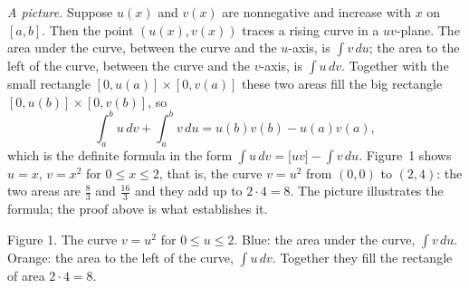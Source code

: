 \documentclass[11pt]{article}
\begin{document}
\emph{A picture.} Suppose $u(x)$ and $v(x)$ are nonnegative and increase with $x$ on $[a,b]$. Then the point $(u(x),v(x))$ traces a rising curve in a $uv$-plane. The area under the curve, between the curve and the $u$-axis, is $\int v\,du$; the area to the left of the curve, between the curve and the $v$-axis, is $\int u\,dv$. Together with the small rectangle $[0,u(a)]\times[0,v(a)]$ these two areas fill the big rectangle $[0,u(b)]\times[0,v(b)]$, so
\[\int_a^bu\,dv+\int_a^bv\,du=u(b)v(b)-u(a)v(a),\]
which is the definite formula in the form $\int u\,dv=\big[uv\big]-\int v\,du$. Figure~1 shows $u=x$, $v=x^2$ for $0\le x\le2$, that is, the curve $v=u^2$ from $(0,0)$ to $(2,4)$: the two areas are $\frac83$ and $\frac{16}3$ and they add up to $2\cdot4=8$. The picture illustrates the formula; the proof above is what establishes it.

\begin{center}
\end{center}
\begin{center}\small Figure 1. The curve $v=u^2$ for $0\le u\le2$. Blue: the area under the curve, $\int v\,du$. Orange: the area to the left of the curve, $\int u\,dv$. Together they fill the rectangle of area $2\cdot4=8$.\end{center}
\end{document}
